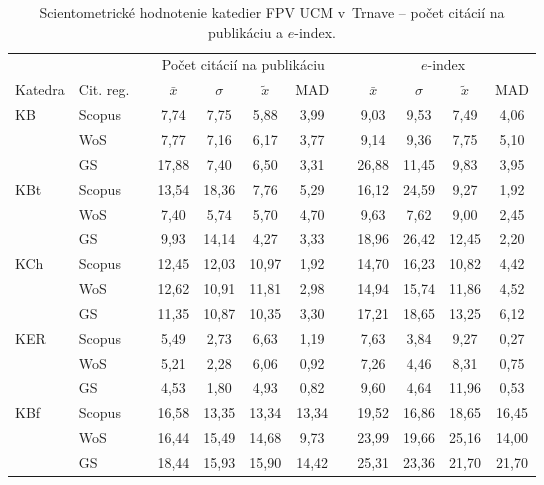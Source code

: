 \begin{table}
  \centering\small
  \caption[Hodnotenie FPV -- počet citácií na publikáciu a $e$-index]%
  {Scientometrické hodnotenie katedier FPV UCM v~Trnave -- počet citácií na
    publikáciu a $e$-index.}
  \label{tab:2-staff.results}
  \begin{tabularx}{\textwidth}{XXp{1ex}ccccp{1ex}cccc}
    \toprule
    & & &\multicolumn{4}{c}{Počet citácií na publikáciu} & &\multicolumn{4}{c}{$e$-index} \\
    \cmidrule{4-7}\cmidrule{9-12}
    Katedra  & Cit. reg. & & $\bar{x}$ & $\sigma$  & $\tilde{x}$ & MAD & & $\bar{x}$ & $\sigma$ & $\tilde{x}$  & MAD \\
    \midrule
    KB   & Scopus & & 7,74  & 7,75  & 5,88  & 3,99  & & 9,03  & 9,53  & 7,49  & 4,06  \\
         & WoS    & & 7,77  & 7,16  & 6,17  & 3,77  & & 9,14  & 9,36  & 7,75  & 5,10  \\
         & GS     & & 17,88 & 7,40  & 6,50  & 3,31  & & 26,88 & 11,45 & 9,83  & 3,95  \\[1ex]
    KBt  & Scopus & & 13,54 & 18,36 & 7,76  & 5,29  & & 16,12 & 24,59 & 9,27  & 1,92  \\
         & WoS    & & 7,40  & 5,74  & 5,70  & 4,70  & & 9,63  & 7,62  & 9,00  & 2,45  \\
         & GS     & & 9,93  & 14,14 & 4,27  & 3,33  & & 18,96 & 26,42 & 12,45 & 2,20  \\[1ex]
    KCh  & Scopus & & 12,45 & 12,03 & 10,97 & 1,92  & & 14,70 & 16,23 & 10,82 & 4,42  \\
         & WoS    & & 12,62 & 10,91 & 11,81 & 2,98  & & 14,94 & 15,74 & 11,86 & 4,52  \\
         & GS     & & 11,35 & 10,87 & 10,35 & 3,30  & & 17,21 & 18,65 & 13,25 & 6,12  \\[1ex]
    KER  & Scopus & & 5,49  & 2,73  & 6,63  & 1,19  & & 7,63  & 3,84  & 9,27  & 0,27  \\
         & WoS    & & 5,21  & 2,28  & 6,06  & 0,92  & & 7,26  & 4,46  & 8,31  & 0,75  \\
         & GS     & & 4,53  & 1,80  & 4,93  & 0,82  & & 9,60  & 4,64  & 11,96 & 0,53  \\[1ex]
    KBf  & Scopus & & 16,58 & 13,35 & 13,34 & 13,34 & & 19,52 & 16,86 & 18,65 & 16,45 \\
         & WoS    & & 16,44 & 15,49 & 14,68 & 9,73  & & 23,99 & 19,66 & 25,16 & 14,00 \\
         & GS     & & 18,44 & 15,93 & 15,90 & 14,42 & & 25,31 & 23,36 & 21,70 & 21,70 \\[1ex]

\end{tabularx}
\end{table}
